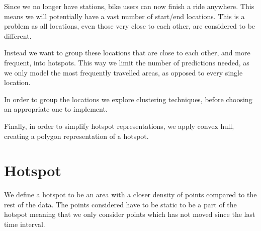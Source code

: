 Since we no longer have stations, bike users can now finish a ride anywhere.
This means we will potentially have a vast number of start/end locations.
This is a problem as all locations, even those very close to each other, are considered to be different.

Instead we want to group these locations that are close to each other, and more frequent, into hotspots.
This way we limit the number of predictions needed, as we only model the most frequently travelled areas, as opposed to every single location.

In order to group the locations we explore clustering techniques, before choosing an appropriate one to implement.

Finally, in order to simplify hotspot representations, we apply convex hull, creating a polygon representation of a hotspot.

\section{Hotspot}\label{hotspot}
We define a hotspot to be an area with a closer density of points compared to the rest of the data.
The points considered have to be static to be a part of the hotspot meaning that we only consider points which has not moved since the last time interval.

